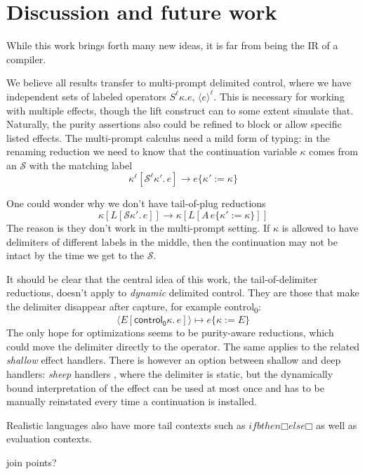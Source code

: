 \documentclass[a4paper, 11pt,titlepage, openright, twoside]{report}
\newcommand{\subst}[2]{\{#1{:=}#2\}}
\renewcommand{\S}{\mathcal{S}}
\newcommand{\+}{\enspace}
\begin{document}
\chapter{Discussion and future work}

While this work brings forth many new ideas, it is far from being the IR of a compiler.

We believe all results transfer to multi-prompt delimited control, where we have independent sets of labeled operators $S^\ell κ. e$, $⟨e⟩^\ell$.
This is necessary for working with multiple effects, though the lift construct can to some extent simulate that.
Naturally, the purity assertions also could be refined to block or allow specific listed effects.
The multi-prompt calculus need a mild form of typing: in the renaming reduction we need to know that the continuation variable $κ$ comes
from an $\S$ with the matching label
$$κ^\ell[\S^\ell κ'.\,e] → e\subst{κ'}{κ}$$

One could wonder why we don't have tail-of-plug reductions
$$κ[L[\S κ'.\,e]] → κ[L[A\,e\subst{κ'}{κ}]]$$
The reason is they don't work in the multi-prompt setting.
If $κ$ is allowed to have delimiters of different labels in the middle, then
the continuation may not be intact by the time we get to the $\S$.

It should be clear that the central idea of this work, the tail-of-delimiter reductions,
doesn't apply to \textit{dynamic} delimited control.
They are those that make the delimiter disappear after capture, for example \textsf{control\textsubscript{0}}:
$$⟨E[\mathsf{control_0} κ.\,e]⟩ ↦ e\subst{κ}{E}$$
The only hope for optimizations seems to be purity-aware reductions,
which could move the delimiter directly to the operator. The same applies to the related \textit{shallow} effect handlers.
There is however an option between shallow and deep handlers: \textit{sheep} handlers \cite{sheep},
where the delimiter is static,
but the dynamically bound interpretation of the effect can be used at most once
and has to be manually reinstated every time a continuation is installed.




Realistic languages also have more tail contexts such as $if b then □ else □$ as well as evaluation contexts.

join points?

\printbibliography[heading=bibintoc]
\end{document}
